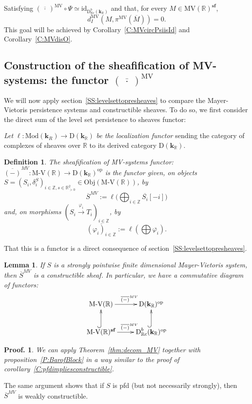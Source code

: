 \documentclass[a4paper, english, 11pt]{article}
\newcommand{\kk}[0]{\textbf{k}}
\newcommand{\Mod}[0]{\text{Mod}}
\newcommand{\0}{\vec{0}}
\newcommand{\R}[0]{\mathbb{R}}
\newcommand{\Z}[0]{\mathbb{Z}}
\newcommand{\D}[0]{\text{D}}
\newcommand{\Obj}[0]{\text{Obj}}
\newcommand{\op}[0]{\text{op}}
\newcommand{\MV}{\text{MV}}
\newcommand{\s}{\textbf{sf}}
\newtheorem*{pf}{Proof.} }
\newtheorem{lem}[prop]{Lemma}
\newtheorem{defi}[prop]{Definition}
\begin{document}
Satisfying $(\overline{~\cdot~ })^{\text{MV}} \circ \Psi \simeq \text{id}_{\D^b_{\R c}(\kk_\R)}$ and that, for every $M\in \text{MV}(\R)^\s$, $$d_I^{\text{MV}}(M, \pi^\MV ( \overline{M})) = 0.$$
This goal will be achieved by Corollary~\ref{C:MVcircPsiisId} and Corollary~\ref{C:MVdisO}.
\subsection{Construction of the sheafification of MV-systems: the functor $(\overline{~\cdot~ })^{\text{MV}}$}\label{SS:MVfunctor}
We will now apply section~\ref{SS:levelsettopresheaves} to compare the Mayer-Vietoris persistence systems and constructible sheaves. To do so, we first consider the direct sum of the level set persistence to sheaves functor: 

\emph{Let} $\ell:\Mod(\kk_R) \to  \D(\kk_\R)$ \emph{be the localization functor} sending the category of complexes of sheaves over $\R$ to its derived category $\D(\kk_\R)$.
\begin{defi}\label{D:MVtoSheaves} The \emph{sheafification of MV-systems functor}: $\overline{(-)}^{MV}: \text{M-V}(\R) \to  \D(\kk_\R)^{\op}$ is the functor given, on
objects $S=(S_i, \delta_i^S)_{i\in \Z, s\in \R^2_{>0}}\in \Obj(\text{M-V}(\R))$, by 
$$ \overline{S}^{MV} := \ell\Big(\bigoplus_{i\in \Z} \overline{S_i}[-i]\Big)$$ and, on morphisms $(S_i\stackrel{\varphi_i}\to T_i)_{i\in \Z}$, by 
$$\overline{(\varphi_i)_{i\in \Z}} := \ell\left(\bigoplus \overline{\varphi_i}\right). $$ 
\end{defi}
That this is a functor is a direct consequence of section~\ref{SS:levelsettopresheaves}.

\begin{lem}\label{L:MVofsfrestricts}
 If $S$ is a strongly pointwise finite dimensional Mayer-Vietoris system, then $\overline{S}^{MV}$ is a constructible sheaf. In particular, we have a commutative diagram of functors:
 $$\xymatrix{ \text{M-V}(\R) \ar[r]^{\quad\overline{(-)}^{MV}} & \D(\kk_\R)^{\op} \\ 
 \text{M-V}(\R)^{\s} \ar@{^{(}->}[u]\ar[r]^{\quad\overline{(-)}^{MV}} & \D^b_{\R c}(\kk_\R)^{\op} \ar@{^{(}->}[u].}  $$
\end{lem}
\begin{pf}
 We can apply Theorem~\ref{thm:decom_MV} together with proposition~\ref{P:BarofBlock} in a way similar to the proof of corollary~\ref{C:pfdimpliesconstructible}.
\end{pf}
The same argument shows that if $S$ is pfd (but not necessarily strongly), then $\overline{S}^{MV}$ is weakly constructible.
\end{document}
